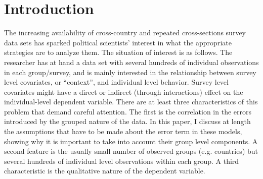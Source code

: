






\section{Introduction}

The increasing availability of cross-country and repeated cross-sections survey data sets has sparked political scientists' interest in what the appropriate strategies are to analyze them. The situation of interest is as follows. The researcher has at hand a data set with several hundreds of individual observations in each group/survey, and is mainly interested in the relationship between survey level covariates, or ``context'', and individual level behavior.  Survey level covariates might have a direct  or indirect (through interactions) effect on the individual-level dependent variable. There are at least three characteristics of this problem that demand careful attention. The first is the correlation in the errors introduced by the grouped nature of the data. In this paper, I discuss at length the assumptions that have to be made about the error term in these models, showing why it is important to take into account their group level components. A second feature is the usually small number of observed groups (e.g. countries) but several hundreds of individual level observations within each group. A third characteristic is the qualitative nature of the dependent variable.

